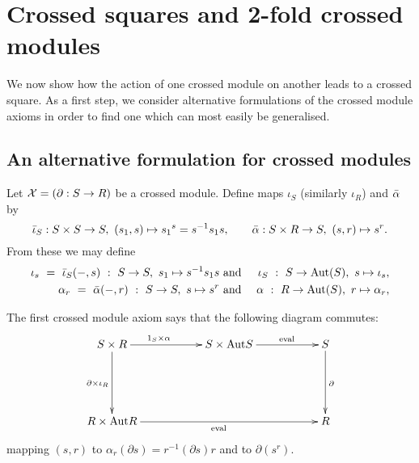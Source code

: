 
\section{Crossed squares and 2-fold crossed modules} \label{sect:xxmod}

We now show how the action of one crossed module on another 
leads to a crossed square.
As a first step, we consider alternative formulations of the
crossed module axioms in order to find one which can most easily
be generalised.


\subsection{An alternative formulation for crossed modules} 
\label{subs:alt-viewt}

Let $\mathcal{X} = (\partial : S \to R)$  be a crossed module.
Define maps $\iota_S$ (similarly $\iota_R$) and $\bar{\alpha}$  by
$$
\bar{\iota}_S : S \times S \to S,~ (s_1,s) \mapsto {s_1}^s = s^{-1}s_1s,
\qquad
\bar{\alpha} : S \times R \to S,~ (s,r) \mapsto s^r.
$$
From these we may define
\begin{eqnarray*}
\iota_s ~=~ \bar{\iota}_S(-,s) ~:~ S \to S,~ s_1 \mapsto s^{-1}s_1s
& ~\mbox{and}~ &
\iota_S ~:~ S \to \mathrm{Aut}(S),~ s \mapsto \iota_s,  \\
\alpha_r ~=~ \bar{\alpha}(-,r) ~:~ S \to S,~ s \mapsto s^r
& ~\mbox{and}~ &
\alpha ~:~ R \to \mathrm{Aut}(S),~ r \mapsto \alpha_r,
\end{eqnarray*}

\medskip\noindent
The first crossed module axiom says that the following diagram commutes: 
\begin{equation} 
\vcenter{\xymatrix{
S \times R \ar[rr]^(0.4){1_S \times \alpha}
           \ar[dd]_{\partial \times \iota_R}
  && S \times \Aut S \ar[rr]^(0.6){{\rm eval}}
    && S \ar[dd]^{\partial} \\
  && && \\
R \times \Aut R \ar[rrrr]_{{\rm eval}}
  && && R
}} 
\end{equation}
mapping $(s,r)$ to $\alpha_r(\partial s) = r^{-1}(\partial s)r$ 
and to $\partial(s^r)$.


